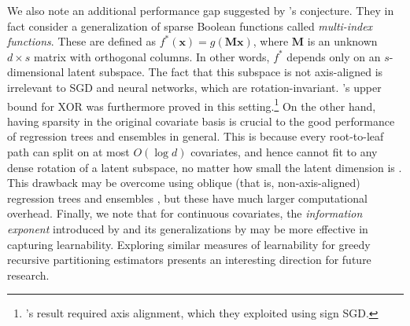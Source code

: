 \documentclass[11pt]{article}
\newcommand{\bx}{\mathbf{x}}
\newcommand{\bM}{\mathbf{M}}
\newcommand{\sparsity}{s}
\newcommand{\nfeats}{d}
\begin{document}
We also note an additional performance gap suggested by \cite{abbe2023sgd}'s conjecture.
They in fact consider a generalization of sparse Boolean functions called \emph{multi-index functions}.
These are defined as $f^*(\bx) = g(\bM\bx)$, where $\bM$ is an unknown $\nfeats \times \sparsity$ matrix with orthogonal columns.
In other words, $f^*$ depends only on an $s$-dimensional latent subspace.
The fact that this subspace is not axis-aligned is irrelevant to SGD and neural networks, which are rotation-invariant.
\cite{Glasgow2024sgd}'s upper bound for XOR was furthermore proved in this setting.\footnote{\cite{kou2024matching}'s result required axis alignment, which they exploited using sign SGD.}
On the other hand, having sparsity in the original covariate basis is crucial to the good performance of regression trees and ensembles in general.
This is because every root-to-leaf path can split on at most $O(\log\nfeats)$ covariates, and hence cannot fit to any dense rotation of a latent subspace, no matter how small the latent dimension is \citep{tan2021cautionary}.
This drawback may be overcome using oblique (that is, non-axis-aligned) regression trees and ensembles \citep{cattaneo2022convergence,o2024statistical}, but these have much larger computational overhead. 
Finally, we note that for continuous covariates, the \emph{information exponent} introduced by \cite{arous2024high} and its generalizations by \cite{oko2024learning,ren2024learning} may be more effective in capturing learnability. 
Exploring similar measures of learnability for greedy recursive partitioning estimators presents an interesting direction for future research.


\end{document}

